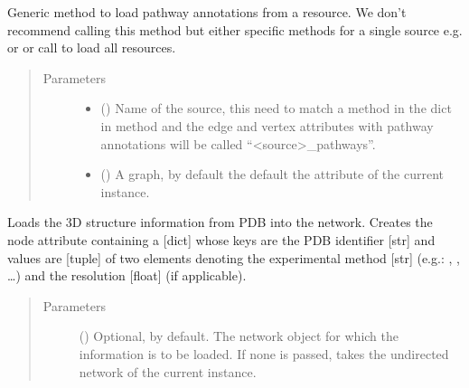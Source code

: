 \documentclass[letterpaper,10pt,english]{sphinxmanual}
\begin{document}
\begin{fulllineitems}
\begin{fulllineitems}
\label{\detokenize{reference:pypath.main.PyPath.load_pathways}}
Generic method to load pathway annotations from a resource.
We don’t recommend calling this method but either specific
methods for a single source e.g. 
or  or call  to
load all resources.
\begin{quote}\begin{description}
\item[{Parameters}] \leavevmode\begin{itemize}
\item {} 
 () \textendash{} Name of the source, this need to match a method in the dict
in  method and the edge and vertex attributes
with pathway annotations will be called “\textless{}source\textgreater{}\_pathways”.

\item {} 
 () \textendash{} A graph, by default the default the  attribute of the
current instance.

\end{itemize}

\end{description}\end{quote}

\end{fulllineitems}


\begin{fulllineitems}
\label{\detokenize{reference:pypath.main.PyPath.load_pdb}}
Loads the 3D structure information from PDB into the network.
Creates the node attribute  containing a {[}dict{]} whose
keys are the PDB identifier {[}str{]} and values are {[}tuple{]} of two
elements denoting the experimental method {[}str{]} (e.g.:
, , …) and the resolution {[}float{]} (if
applicable).
\begin{quote}\begin{description}
\item[{Parameters}] \leavevmode
{} () \textendash{} Optional,  by default. The network object for which
the information is to be loaded. If none is passed, takes
the undirected network of the current instance.


\end{description}
\end{quote}
\end{fulllineitems}
\end{fulllineitems}
\end{document}
